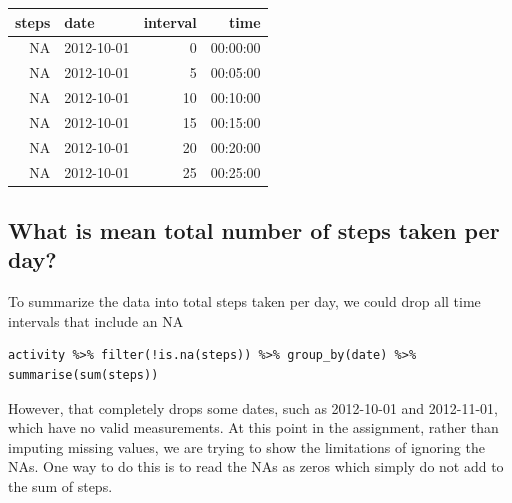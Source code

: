 \documentclass[]{article}
\newenvironment{Shaded}{\begin{snugshade}}{\end{snugshade}}
\newcommand{\KeywordTok}[1]{\textcolor[rgb]{0.13,0.29,0.53}{\textbf{{#1}}}}
\newcommand{\DataTypeTok}[1]{\textcolor[rgb]{0.13,0.29,0.53}{{#1}}}
\newcommand{\DecValTok}[1]{\textcolor[rgb]{0.00,0.00,0.81}{{#1}}}
\newcommand{\StringTok}[1]{\textcolor[rgb]{0.31,0.60,0.02}{{#1}}}
\newcommand{\CommentTok}[1]{\textcolor[rgb]{0.56,0.35,0.01}{\textit{{#1}}}}
\newcommand{\NormalTok}[1]{{#1}}
\begin{document}
\begin{Shaded}
\end{Shaded}

\begin{longtable}[c]{@{}rlrr@{}}
\toprule
steps & date & interval & time\tabularnewline
\midrule
\endhead
NA & 2012-10-01 & 0 & 00:00:00\tabularnewline
NA & 2012-10-01 & 5 & 00:05:00\tabularnewline
NA & 2012-10-01 & 10 & 00:10:00\tabularnewline
NA & 2012-10-01 & 15 & 00:15:00\tabularnewline
NA & 2012-10-01 & 20 & 00:20:00\tabularnewline
NA & 2012-10-01 & 25 & 00:25:00\tabularnewline
\bottomrule
\end{longtable}

\subsection{What is mean total number of steps taken per
day?}\label{what-is-mean-total-number-of-steps-taken-per-day}

To summarize the data into total steps taken per day, we could drop all
time intervals that include an NA

\begin{verbatim}
activity %>% filter(!is.na(steps)) %>% group_by(date) %>% summarise(sum(steps))
\end{verbatim}

However, that completely drops some dates, such as 2012-10-01 and
2012-11-01, which have no valid measurements. At this point in the
assignment, rather than imputing missing values, we are trying to show
the limitations of ignoring the NAs. One way to do this is to read the
NAs as zeros which simply do not add to the sum of steps.

\begin{Shaded}
\end{Shaded}
\end{document}
